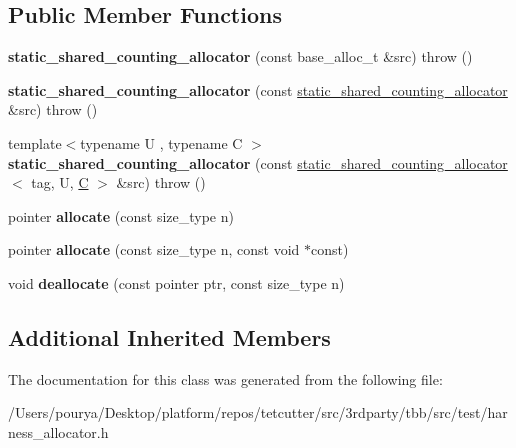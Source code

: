 \subsection*{Public Member Functions}
\begin{DoxyCompactItemize}
\item 
\hypertarget{classstatic__shared__counting__allocator_a23679d0e75790e95a92dc5b87fe0d888}{}{\bfseries static\+\_\+shared\+\_\+counting\+\_\+allocator} (const base\+\_\+alloc\+\_\+t \&src)  throw ()\label{classstatic__shared__counting__allocator_a23679d0e75790e95a92dc5b87fe0d888}

\item 
\hypertarget{classstatic__shared__counting__allocator_a5f23180b4a2000fedca2330707c2ff7d}{}{\bfseries static\+\_\+shared\+\_\+counting\+\_\+allocator} (const \hyperlink{classstatic__shared__counting__allocator}{static\+\_\+shared\+\_\+counting\+\_\+allocator} \&src)  throw ()\label{classstatic__shared__counting__allocator_a5f23180b4a2000fedca2330707c2ff7d}

\item 
\hypertarget{classstatic__shared__counting__allocator_a9771256f4afedf2123963944d72705af}{}{\footnotesize template$<$typename U , typename C $>$ }\\{\bfseries static\+\_\+shared\+\_\+counting\+\_\+allocator} (const \hyperlink{classstatic__shared__counting__allocator}{static\+\_\+shared\+\_\+counting\+\_\+allocator}$<$ tag, U, \hyperlink{classC}{C} $>$ \&src)  throw ()\label{classstatic__shared__counting__allocator_a9771256f4afedf2123963944d72705af}

\item 
\hypertarget{classstatic__shared__counting__allocator_a8edc7d7f4737ecabd6bbf92df53c75fb}{}pointer {\bfseries allocate} (const size\+\_\+type n)\label{classstatic__shared__counting__allocator_a8edc7d7f4737ecabd6bbf92df53c75fb}

\item 
\hypertarget{classstatic__shared__counting__allocator_aa69cdddf28224c9574fab824710afd02}{}pointer {\bfseries allocate} (const size\+\_\+type n, const void $\ast$const)\label{classstatic__shared__counting__allocator_aa69cdddf28224c9574fab824710afd02}

\item 
\hypertarget{classstatic__shared__counting__allocator_a1ce10a48255dacf0421b4377f611897a}{}void {\bfseries deallocate} (const pointer ptr, const size\+\_\+type n)\label{classstatic__shared__counting__allocator_a1ce10a48255dacf0421b4377f611897a}

\end{DoxyCompactItemize}
\subsection*{Additional Inherited Members}


The documentation for this class was generated from the following file\+:\begin{DoxyCompactItemize}
\item 
/\+Users/pourya/\+Desktop/platform/repos/tetcutter/src/3rdparty/tbb/src/test/harness\+\_\+allocator.\+h\end{DoxyCompactItemize}
